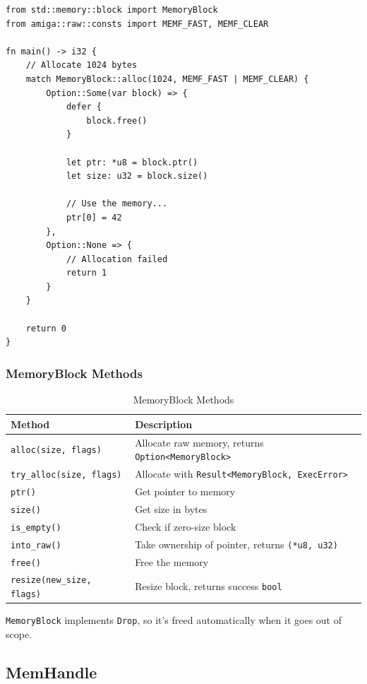 \begin{lstlisting}
from std::memory::block import MemoryBlock
from amiga::raw::consts import MEMF_FAST, MEMF_CLEAR

fn main() -> i32 {
    // Allocate 1024 bytes
    match MemoryBlock::alloc(1024, MEMF_FAST | MEMF_CLEAR) {
        Option::Some(var block) => {
            defer {
                block.free()
            }

            let ptr: *u8 = block.ptr()
            let size: u32 = block.size()

            // Use the memory...
            ptr[0] = 42
        },
        Option::None => {
            // Allocation failed
            return 1
        }
    }

    return 0
}
\end{lstlisting}

\subsubsection{MemoryBlock Methods}

\begin{table}[h]
\centering
\begin{tabular}{lp{8cm}}
\hline
\textbf{Method} & \textbf{Description} \\
\hline
\texttt{alloc(size, flags)} & Allocate raw memory, returns \texttt{Option<MemoryBlock>} \\
\texttt{try\_alloc(size, flags)} & Allocate with \texttt{Result<MemoryBlock, ExecError>} \\
\texttt{ptr()} & Get pointer to memory \\
\texttt{size()} & Get size in bytes \\
\texttt{is\_empty()} & Check if zero-size block \\
\texttt{into\_raw()} & Take ownership of pointer, returns \texttt{(*u8, u32)} \\
\texttt{free()} & Free the memory \\
\texttt{resize(new\_size, flags)} & Resize block, returns success \texttt{bool} \\
\hline
\end{tabular}
\caption{MemoryBlock Methods}
\end{table}

\texttt{MemoryBlock} implements \texttt{Drop}, so it's freed automatically when it goes out of scope.

\subsection{MemHandle}

